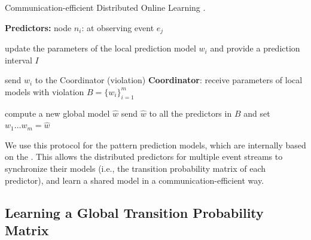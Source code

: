 \begin{algorithm}[h]
	\caption{Communication-efficient Distributed Online Learning \cite{kamp2014communication}.} 
	\begin{algorithmic}[1] 
		
		\Statex \Indm  \textbf{Predictors:}
		\Statex \Indp node $n_i$: at observing event $e_j$
		
		\Statex \Indp update the parameters of the local prediction model $w_i$ and provide a prediction interval $I$ \;
	 

		\Statex {}  
		\Statex send  $w_i$ to the Coordinator (violation) \;
		\Statex \Indm \textbf{Coordinator}:
		\Statex \Indp receive parameters of local models with violation 
		 $B=\{w_i\}_{i=1}^m$ \;
	
	
		\Statex {}
        \Statex
		\Statex compute a new global model $\hat{w}$ \;
		\Statex send $\hat{w}$ to all the predictors in $B$ and set $w_{1}\dots w_{m}=\hat{w} $\; 
		\Statex {}
	
	\end{algorithmic}
	\label{algonline:dol}
\end{algorithm}


\par  We use this protocol for the pattern prediction models, which are internally based on the \pmcmr. This allows the distributed \pmcmr predictors for multiple event streams to synchronize their models (i.e., the transition probability matrix of each predictor), and learn a shared model in a communication-efficient way. 


\subsection*{Learning a Global Transition Probability Matrix}

